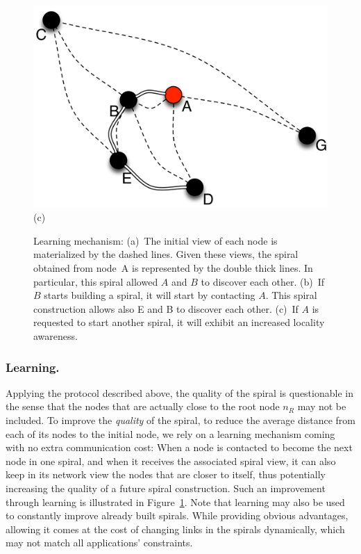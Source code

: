 \begin{figure}[ht]
{\begin{center}
{\begin{minipage}{.3\linewidth}
	  \begin{center}
	    \includegraphics[width=1.05\linewidth]{Figures/learning3.png}\\(c)
	  \end{center}
	\end{minipage}
	\caption{Learning mechanism: (a)~The initial view of each node is materialized by
          the dashed lines. Given these views, the spiral obtained from node~A is
          represented by the double thick lines. In particular, this spiral allowed $A$
          and $B$ to discover each other. (b)~If $B$ starts building a spiral, it will
          start by contacting $A$. This spiral construction allows also E and B to
          discover each other. (c)~If $A$ is requested to start another spiral, it will
          exhibit an increased locality awareness.\label{fig:learning}} }
      \end{center}
}
\end{figure}

\subsubsection*{Learning.}

Applying the protocol described above, the quality of the spiral is questionable in the
sense that the nodes that are actually close to the root node $n_R$ may not be
included.%
%
To improve the \emph{quality} of the spiral, \ie to reduce the average
distance from each of its nodes to the initial node, we rely on a learning
mechanism coming with no extra communication cost: When a node is contacted to
become the next node in one spiral, and when it receives the associated spiral
view, it can also keep in its network view the nodes that are closer to itself,
thus potentially increasing the quality of a future spiral construction. Such an
improvement through learning is illustrated in Figure~\ref{fig:learning}. Note
that learning may also be used to constantly improve already built
spirals. While providing obvious advantages, allowing it comes at the cost of
changing links in the spirals dynamically, which may not match all applications'
constraints.

